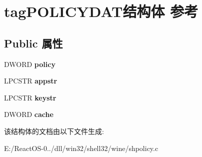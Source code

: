 \hypertarget{structtag_p_o_l_i_c_y_d_a_t}{}\section{tag\+P\+O\+L\+I\+C\+Y\+D\+A\+T结构体 参考}
\label{structtag_p_o_l_i_c_y_d_a_t}
\subsection*{Public 属性}
\begin{DoxyCompactItemize}
\item 
\mbox{\label{structtag_p_o_l_i_c_y_d_a_t_a13822c40761314b91cf9cf603c90b74d}} 
D\+W\+O\+RD {\bfseries policy}
\item 
\mbox{\label{structtag_p_o_l_i_c_y_d_a_t_ae8172a6e880fa0a97a7a04261a78eccc}} 
L\+P\+C\+S\+TR {\bfseries appstr}
\item 
\mbox{\label{structtag_p_o_l_i_c_y_d_a_t_abe010136ff5525d1bd8a3fc82e904f60}} 
L\+P\+C\+S\+TR {\bfseries keystr}
\item 
\mbox{\label{structtag_p_o_l_i_c_y_d_a_t_a66cd52484b6e2583c9c0ea829caf46a7}} 
D\+W\+O\+RD {\bfseries cache}
\end{DoxyCompactItemize}


该结构体的文档由以下文件生成\+:\begin{DoxyCompactItemize}
\item 
E\+:/\+React\+O\+S-\/0../dll/win32/shell32/wine/shpolicy.\+c\end{DoxyCompactItemize}

